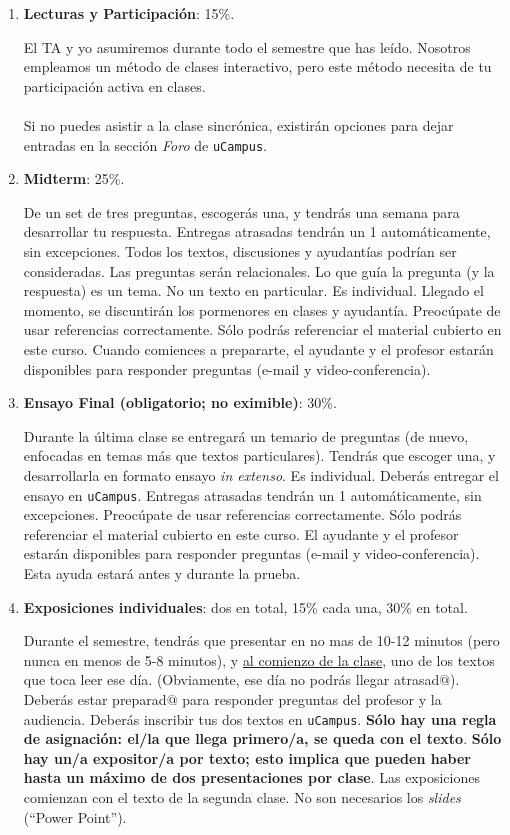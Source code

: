 \documentclass[letterpaper]{article}
\begin{document}
\begin{enumerate}

	\item {\bf Lecturas y Participaci\'on}: 15\%.

		El TA y yo asumiremos durante todo el semestre que has le\'ido. Nosotros empleamos un m\'etodo de clases interactivo, pero este m\'etodo necesita de tu participaci\'on activa en clases.
		\\
		\\	
		Si no puedes asistir a la clase sincr\'onica, existir\'an opciones para dejar entradas en la secci\'on \emph{Foro} de \texttt{uCampus}.
	
  \item {\bf Midterm}: 25\%.

		De un set de tres preguntas, escoger\'as una, y tendr\'as una semana para desarrollar tu respuesta. Entregas atrasadas tendr\'an un 1 autom\'aticamente, sin excepciones. Todos los textos, discusiones y ayudant\'ias podr\'ian ser consideradas. Las preguntas ser\'an relacionales. Lo que gu\'ia la pregunta (y la respuesta) es un tema. No un texto en particular. Es individual. Llegado el momento, se discuntir\'an los pormenores en clases y ayudant\'ia. Preoc\'upate de usar referencias correctamente. S\'olo podr\'as referenciar el material cubierto en este curso. Cuando comiences a prepararte, el ayudante y el profesor estar\'an disponibles para responder preguntas (e-mail y video-conferencia).

	\item {\bf Ensayo Final (obligatorio; no eximible)}: 30\%. 

	Durante la \'ultima clase se entregar\'a un temario de preguntas (de nuevo, enfocadas en temas m\'as que textos particulares). Tendr\'as que escoger una, y desarrollarla en formato ensayo \emph{in extenso}. Es individual. Deber\'as entregar el ensayo en \texttt{uCampus}. Entregas atrasadas tendr\'an un 1 autom\'aticamente, sin excepciones. Preoc\'upate de usar referencias correctamente. S\'olo podr\'as referenciar el material cubierto en este curso. El ayudante y el profesor estar\'an disponibles para responder preguntas (e-mail y video-conferencia). Esta ayuda estar\'a antes y durante la prueba. 

	\item {\bf Exposiciones individuales}: dos en total, 15\% cada una, 30\% en total.

	Durante el semestre, tendr\'as que presentar en no mas de 10-12 minutos (pero nunca en menos de 5-8 minutos), y \underline{al comienzo de la clase}, uno de los textos que toca leer ese d\'ia. (Obviamente, ese d\'ia no podr\'as llegar atrasad$@$). Deber\'as estar preparad$@$ para responder preguntas del profesor y la audiencia. Deber\'as inscribir tus dos textos en \texttt{uCampus}. {\bf S\'olo hay una regla de asignaci\'on: el/la que llega primero/a, se queda con el texto}. {\bf S\'olo hay un/a expositor/a por texto; esto implica que pueden haber hasta un m\'aximo de dos presentaciones por clase}. Las exposiciones comienzan con el texto de la segunda clase. No son necesarios los \emph{slides} (``Power Point''). 


\end{enumerate}
\end{document}
